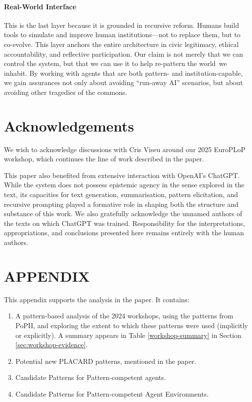 \documentclass[acmlarge,timestamp]{acmart}
\begin{document}
{\paragraph{Real-World Interface}

This is the last layer because it is grounded in recursive reform.
Humans build tools to simulate and improve human institutions---not to
replace them, but to co-evolve.  This layer anchors the entire
architecture in civic legitimacy, ethical accountability, and
reflective participation. Our claim is not merely that we can control
the system, but that we can use it to help re-pattern the world~we
inhabit.  By working with agents that are both pattern- and
institution-capable, we gain assurances not only about avoiding
``run-away AI'' scenarios, but about avoiding other tragedies of the
commons.

\section{Acknowledgements}\label{sec:ack}
We wish to acknowledge discussions with Cris Viseu around our 2025
EuroPLoP workshop, which continues the line of work described in the
paper.

This paper also benefited from extensive interaction with OpenAI’s
ChatGPT.  While the system does not possess epistemic agency in the
sense explored in the text, its capacities for text generation,
summarisation, pattern elicitation, and recursive prompting played a
formative role in shaping both the structure and substance of this
work.  We also gratefully acknowledge the unnamed authors of the texts
on which ChatGPT was trained.  Responsibility for the interpretations,
appropriations, and conclusions presented here remains entirely with
the human authors.



\section*{APPENDIX}

This appendix supports the analysis in the paper. It contains:

\begin{enumerate}
\item A pattern-based analysis of the 2024 workshops, using the patterns from PoPII, and exploring the extent to which these patterns were used (implicitly or explicitly).  A summary appears in Table \ref{workshop-summary} in Section \ref{sec:workshop-evidence}.
\item Potential new PLACARD patterns, mentioned in the paper.
\item Candidate Patterns for Pattern-competent agents.
\item Candidate Patterns for Pattern-competent Agent Environments.
\end{enumerate}

}
\end{document}
